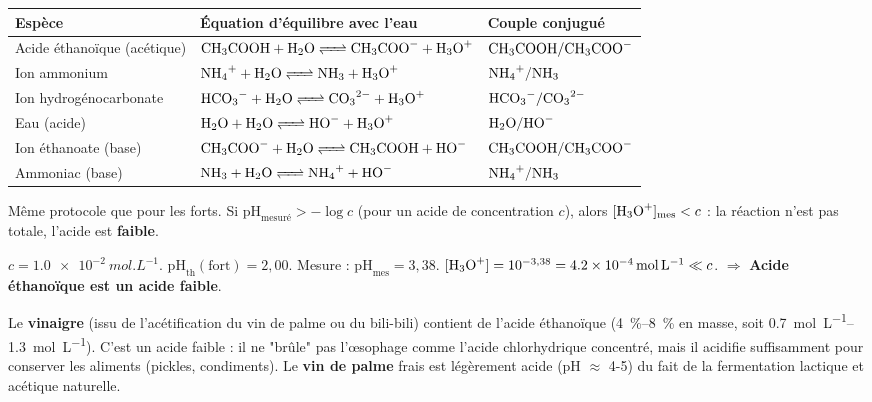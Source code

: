 \documentclass[11pt]{article}
\begin{document}
\begin{propriete}
\begin{center}
\begin{tabularx}{\linewidth}{|l|X|X|}
\hline
\rowcolor{popblueL} \textbf{Espèce} & \textbf{Équation d'équilibre avec l'eau} & \textbf{Couple conjugué} \\
\hline
Acide éthanoïque (acétique) & $\ce{CH3COOH + H2O <=> CH3COO- + H3O+}$ & $\ce{CH3COOH}/\ce{CH3COO-}$ \\
\hline
Ion ammonium & $\ce{NH4+ + H2O <=> NH3 + H3O+}$ & $\ce{NH4+}/\ce{NH3}$ \\
\hline
Ion hydrogénocarbonate & $\ce{HCO3- + H2O <=> CO3^2- + H3O+}$ & $\ce{HCO3-}/\ce{CO3^2-}$ \\
\hline
Eau (acide) & $\ce{H2O + H2O <=> HO- + H3O+}$ & $\ce{H2O}/\ce{HO-}$ \\
\hline
Ion éthanoate (base) & $\ce{CH3COO- + H2O <=> CH3COOH + HO-}$ & $\ce{CH3COOH}/\ce{CH3COO-}$ \\
\hline
Ammoniac (base) & $\ce{NH3 + H2O <=> NH4+ + HO-}$ & $\ce{NH4+}/\ce{NH3}$ \\
\hline
\end{tabularx}
\end{center}
\end{propriete}

\begin{methode}
Même protocole que pour les forts. Si $\text{pH}_{\text{mesuré}} > -\log c$ (pour un acide de concentration $c$), alors $[\ce{H3O+}]_{\text{mes}} < c$ : la réaction n'est pas totale, l'acide est \textbf{faible}.
\end{methode}

\begin{exemplebox}
$c = \SI{1,0e-2}{mol.L^{-1}}$. $\text{pH}_{\text{th}}(\text{fort}) = 2,00$.
Mesure : $\text{pH}_{\text{mes}} = 3,38$.
$[\ce{H3O+}] = 10^{-3,38} = \SI{4,2e-4}{mol.L^{-1}} \ll c$.
$\Rightarrow$ \textbf{Acide éthanoïque est un acide faible}.
\end{exemplebox}

\begin{savaistu}
Le \textbf{vinaigre} (issu de l'acétification du vin de palme ou du bili-bili) contient de l'acide éthanoïque (\SIrange{4}{8}{\%} en masse, soit \SIrange{0,7}{1,3}{mol.L^{-1}}). C'est un acide faible : il ne "brûle" pas l'œsophage comme l'acide chlorhydrique concentré, mais il acidifie suffisamment pour conserver les aliments (pickles, condiments). Le \textbf{vin de palme} frais est légèrement acide (pH $\approx$ 4-5) du fait de la fermentation lactique et acétique naturelle.
\end{savaistu}
\end{document}
